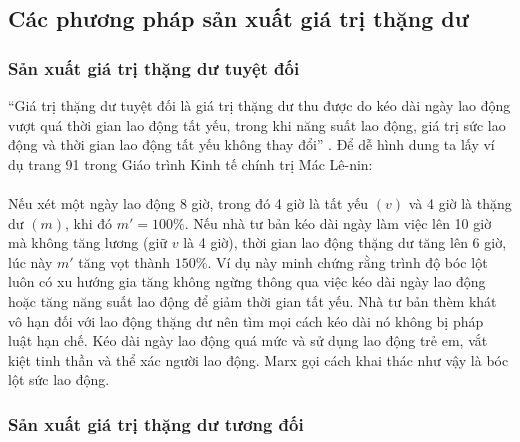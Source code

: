 \subsection{Các phương pháp sản xuất giá trị thặng dư}

\subsubsection{Sản xuất giá trị thặng dư tuyệt đối}

“Giá trị thặng dư tuyệt đối là giá trị thặng dư thu được do kéo dài ngày lao động vượt quá thời gian lao động tất yếu, trong khi năng suất lao động, giá trị sức lao động và thời gian lao động tất yếu không thay đổi” \cite[trang 91]{gt}. Để dễ hình dung ta lấy ví dụ trang 91 trong Giáo trình Kinh tế chính trị Mác Lê-nin:\\\\
Nếu xét một ngày lao động 8 giờ, trong đó 4 giờ là tất yếu $(v)$ và 4 giờ là thặng dư $(m)$, khi đó $m' = 100\%$. Nếu nhà tư bản kéo dài ngày làm việc lên 10 giờ mà không tăng lương (giữ $v$ là 4 giờ), thời gian lao động thặng dư tăng lên 6 giờ, lúc này $m'$ tăng vọt thành $150\%$. Ví dụ này minh chứng rằng trình độ bóc lột luôn có xu hướng gia tăng không ngừng thông qua việc kéo dài ngày lao động hoặc tăng năng suất lao động để giảm thời gian tất yếu. Nhà tư bản thèm khát vô hạn đối với lao động thặng dư nên tìm mọi cách kéo dài nó không bị pháp luật hạn chế. Kéo dài ngày lao động quá mức và sử dụng lao động trẻ em, vắt kiệt tinh thần và thể xác người lao động. Marx gọi cách khai thác như vậy là bóc lột sức lao động.

\subsubsection{Sản xuất giá trị thặng dư tương đối}


